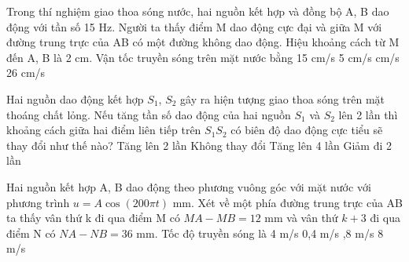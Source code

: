 \begin{vidu}%
Trong thí nghiệm giao thoa sóng nước, hai nguồn kết hợp và đồng bộ A, B dao động với tần số 15 Hz. Người ta thấy điểm M dao động cực đại và giữa M với đường trung trực của AB có một đường không dao động. Hiệu khoảng cách từ M đến A, B là 2 cm. Vận tốc truyền sóng trên mặt nước bằng
\choice
{15 cm/s}
{5 cm/s}
{ cm/s}
{26 cm/s}
\end{vidu} 
\begin{vidu}%
Hai nguồn dao động kết hợp $S_1$, $S_2$ gây ra hiện tượng giao thoa sóng trên mặt thoáng chất lỏng. Nếu tăng tần số dao động của hai nguồn $S_1$ và $S_2$ lên 2 lần thì khoảng cách giữa hai điểm liên tiếp trên $S_1S_2$ có biên độ dao động cực tiểu sẽ thay đổi như thế nào?
\choice
{Tăng lên 2 lần}
{Không thay đổi}
{Tăng lên 4 lần}
{\True Giảm đi 2 lần}
\end{vidu} 
\begin{vidu}%
Hai nguồn kết hợp A, B dao động theo phương vuông góc với mặt nước với phương trình $u=A\cos(200\pi t)$ mm. Xét về một phía đường trung trực của AB ta thấy vân thứ k đi qua điểm M có $MA-MB=12$ mm và vân thứ $k+3$ đi qua điểm N có $NA - NB=36$ mm. Tốc độ truyền sóng là
\choice
{4 m/s}
{0,4 m/s}
{,8 m/s}
{8 m/s}
\end{vidu} 

